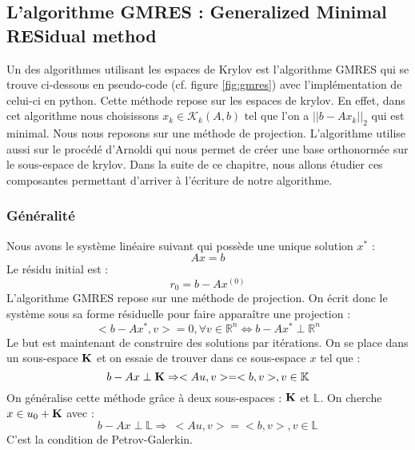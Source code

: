\subsection{L'algorithme GMRES : Generalized Minimal RESidual method}
Un des algorithmes utilisant les espaces de Krylov est l'algorithme GMRES qui se trouve ci-dessous en pseudo-code (cf. figure \ref{fig:gmres}) avec l'implémentation de celui-ci en python. Cette méthode repose sur les espaces de krylov. En effet, dans cet algorithme nous choisissons $x_k \in \mathcal{K}_k(A, b)$ tel que l'on a $||b - Ax_k||_2$ qui est minimal. Nous nous reposons sur une méthode de projection. L'algorithme utilise aussi sur le procédé d'Arnoldi qui nous permet de créer une base orthonormée sur le sous-espace de krylov. Dans la suite de ce chapitre, nous allons étudier ces composantes permettant d'arriver à l'écriture de notre algorithme.

\subsubsection{Généralité}
Nous avons le système linéaire suivant qui possède une unique solution $x^*$ : 
\begin{equation}
	Ax = b
\end{equation}
Le résidu initial est  : 
\begin{equation}
r_0 = b - A x^{(0)}
\end{equation}
L'algorithme GMRES repose sur une méthode de projection. On écrit donc le système sous sa forme résiduelle pour faire apparaître une projection : 
\begin{equation}
< b - Ax^*, v > = 0, \forall v \in \mathbb{R}^n \Leftrightarrow b - Ax^* \perp \mathbb{R}^n
\label{pb_res}
\end{equation}
Le but est maintenant de construire des solutions par itérations. On se place dans un sous-espace $\mathbf{K}$ et on essaie de trouver dans ce sous-espace $x$ tel que : 
\begin{equation}
b - Ax \perp \mathbf{K} \Rightarrow <Au, v> = <b, v>, v \in \mathbb{K}
\end{equation}
On généralise cette méthode grâce à deux sous-espaces : $\mathbf{K}$ et  $\mathbb{L}$. On cherche $x \in u_0 + \mathbf{K}$ avec :
\begin{equation}
b - Ax \perp \mathbb{L} \Rightarrow \ <Au, v> = <b, v>, v \in \mathbb{L}
\label{Petrov-Galerkin}
\end{equation}
C'est la condition de Petrov-Galerkin.

